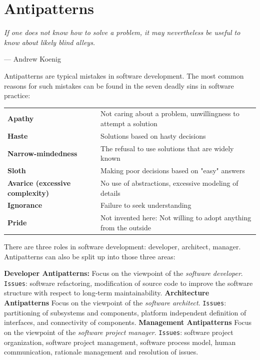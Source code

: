
\section{Antipatterns}
\textit{\large If one does not know how to solve a problem, it may nevertheless be useful to know about likely blind alleys.}
\begin{flushright}
	--- Andrew Koenig
\end{flushright}

Antipatterns are typical mistakes in software development. The most common reasons for such mistakes can be found in the seven deadly sins in software practice:\newline

\begin{tabular}{ll}
	\textbf{Apathy} & Not caring about a problem, unwillingness to attempt a solution \\ 
	\textbf{Haste} & Solutions based on hasty decisions \\ 
	\textbf{Narrow-mindedness} & The refusal to use solutions that are widely known \\ 
	\textbf{Sloth} & Making poor decisions based on "easy" answers \\ 
	\textbf{Avarice (excessive complexity)} & No use of abstractions, excessive modeling of details \\ 
	\textbf{Ignorance} & Failure to seek understanding \\ 
	\textbf{Pride} & Not invented here: Not willing to adopt anything from the outside
\end{tabular}
\vspace{0.5cm}
\newline
There are three roles in software development: developer, architect, manager. Antipatterns can also be split up into those three areas:\newline

\textbf{Developer Antipatterns:}
Focus on the viewpoint of the \textit{software developer}.\newline
\texttt{Issues}: software refactoring, modification of source code to
improve the software structure with respect to long-term
maintainability.\newline
\textbf{Architecture Antipatterns}
Focus on the viewpoint of the \textit{software architect}.\newline
\texttt{Issues}: partitioning of subsystems and components, platform
independent definition of interfaces, and connectivity of
components.\newline
\textbf{Management Antipatterns}
Focus on the viewpoint of the \textit{software project manager}.\newline
\texttt{Issues}: software project organization, software project
management, software process model, human communication,
rationale management and resolution of issues.\newline

